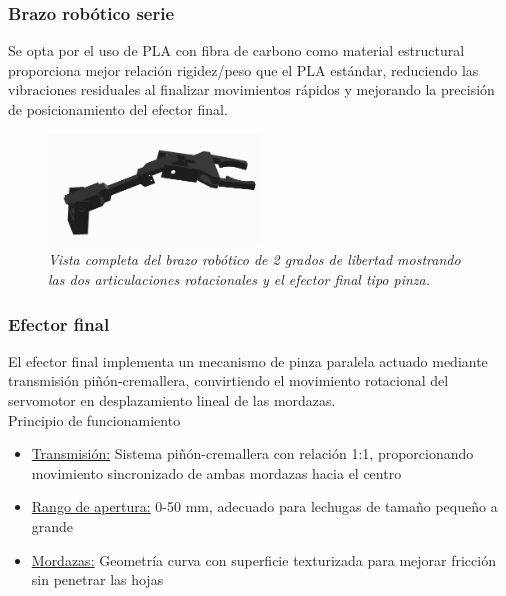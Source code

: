 \subsubsection{Brazo robótico serie}

Se opta por el uso de PLA con fibra de carbono como material estructural proporciona mejor relación rigidez/peso que el PLA estándar, reduciendo las vibraciones residuales al finalizar movimientos rápidos y mejorando la precisión de posicionamiento del efector final.

\begin{figure}[H]
    \centering
    \includegraphics[width=0.5\textwidth]{img/brazo_completo.jpg}
    \caption{\textit{Vista completa del brazo robótico de 2 grados de libertad mostrando las dos articulaciones rotacionales y el efector final tipo pinza.}}
    \label{fig:brazo_Real}
\end{figure}

\subsubsection{Efector final}

El efector final implementa un mecanismo de pinza paralela actuado mediante transmisión piñón-cremallera, convirtiendo el movimiento rotacional del servomotor en desplazamiento lineal de las mordazas.\\

Principio de funcionamiento

\begin{itemize}[label=$\bullet$]
    \item \underline{Transmisión:} Sistema piñón-cremallera con relación 1:1, proporcionando movimiento sincronizado de ambas mordazas hacia el centro
    \item \underline{Rango de apertura:} 0-50 mm, adecuado para lechugas de tamaño pequeño a grande
    \item \underline{Mordazas:} Geometría curva con superficie texturizada para mejorar fricción sin penetrar las hojas
\end{itemize}

